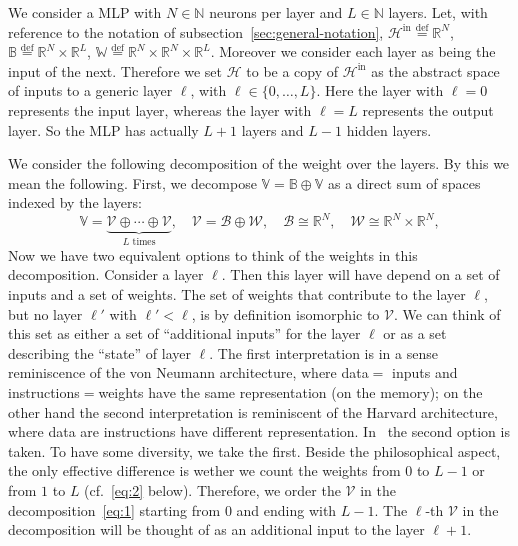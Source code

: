 \documentclass[10pt, a4paper]{article}
\theoremstyle{plain}
\theoremstyle{definition}
\theoremstyle{definition}
\theoremstyle{definition}
\theoremstyle{definition}
\theoremstyle{definition}
\theoremstyle{definition}
\theoremstyle{definition}
\theoremstyle{remark}
\theoremstyle{remark}
\theoremstyle{rudin-style-generic}
\theoremstyle{rudin-style-generic*}
\theoremstyle{rudin-style-theorem}
\newcommand{\deq}{\stackrel{\mathrm{def}}{=}}
\newcommand{\NN}{\mathbb N}
\newcommand{\RR}{\mathbb R}
\begin{document}


  We consider a MLP  with $N\in\NN$ neurons per layer and $L\in\NN$ layers.
  Let, with reference to  the notation of subsection~\ref{sec:general-notation},
  $\mathcal H^{\text{in}} \deq \RR^N$, $\mathbb B \deq \RR^{N}\times\RR^{L}$, $\mathbb W \deq \RR^{N}\times\RR^N\times\RR^L$.
  Moreover we consider each layer as being the input of the next.
  Therefore we set $\mathcal H$ to be a copy of $\mathcal H^{\text{in}}$
  as the abstract space of inputs to a generic layer $\ell$, with $\ell\in\{0,\dots, L\}$.
  Here the layer with $\ell=0$ represents the input layer, whereas the layer with $\ell=L$ represents the output layer.
  So the MLP has actually $L+1$ layers and $L-1$ hidden layers. 

  We consider the following decomposition of the weight over the layers.
  By this we mean the following.
  First, we decompose $\mathbb V =\mathbb B\oplus\mathbb V$ as a direct sum of spaces indexed by the layers:
  \begin{equation}
    \label{eq:1}
    \mathbb V = \underbrace{\mathcal V \oplus\cdots\oplus \mathcal V}_{L \text{ times}} ,
    \quad
    \mathcal V = \mathcal B\oplus \mathcal W, \quad \mathcal B\cong\RR^N,\quad\mathcal W\cong\RR^N\times\RR^N
    ,
  \end{equation}
  Now we have two equivalent options to think of the weights in this decomposition.
  Consider a layer $\ell$. Then this layer will have depend on a set of inputs and a set of weights.
  The set of weights that contribute to the layer $\ell$, but no layer $\ell'$ with $\ell'<\ell$, is by definition isomorphic to $\mathcal V$.
  We can think of this set  as either a set of ``additional inputs'' for the layer $\ell$ or as a set describing the ``state'' of layer $\ell$.
  The first interpretation is in a sense reminiscence of the von Neumann architecture,
  where data$=$ inputs and instructions$=$weights have the same representation (on the memory);
  on the other hand the second interpretation is reminiscent of the Harvard architecture, where data are instructions have different representation.
  In~\cite{goodfellowDeepLearning2016} the second option is taken.
  To have some diversity, we take the first.
  Beside the philosophical aspect, the only effective difference is wether we count the weights from $0$ to $L-1$ or from $1$ to $L$
  (cf.~\eqref{eq:2} below).
  Therefore, we order the $\mathcal V$ in the decomposition~\eqref{eq:1} starting from $0$ and ending with $L-1$.
  The $\ell$-th $\mathcal V$ in the decomposition will be thought of as an additional input to the layer $\ell+1$.
\end{document}
